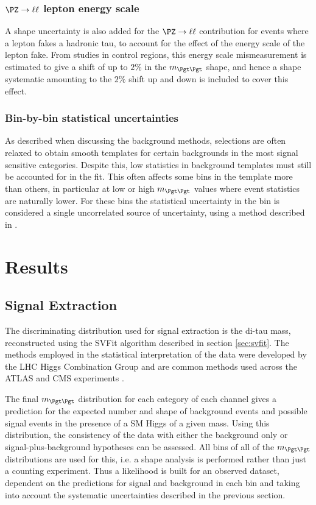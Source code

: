 \subsubsection{\textbf{$\PZ \to \ell\ell$ lepton energy scale}}
A shape uncertainty is also added for the $\PZ \to \ell\ell$ contribution for 
events where a lepton fakes a hadronic tau, to account for the effect of the energy 
scale of the lepton fake. From studies in control regions, this energy scale mismeasurement is 
estimated to give a shift of up to $2\%$ in the $m_{\Pgt\Pgt}$ shape, and hence a shape systematic amounting to the
$2\%$ shift up and down is included to cover this effect. %

\subsubsection{\textbf{Bin-by-bin statistical uncertainties}}
As described when discussing the background methods, selections are often
relaxed to obtain smooth templates for certain backgrounds in the most signal
sensitive categories. Despite this, low statistics in background templates must
still be accounted for in the fit. This often affects some bins in the
template more than others, in particular at low or high $m_{\Pgt\Pgt}$ values
where event statistics are naturally lower. For these bins the statistical
uncertainty in the bin is considered a single uncorrelated source of
uncertainty, using a method described in \cite{Barlow1993219}. 



\section{Results}
\label{sec:results}

\subsection{Signal Extraction}
\label{sec:signalextraction}

The discriminating distribution used for signal extraction is the di-tau mass,
reconstructed using the SVFit algorithm described in section \ref{sec:svfit}. 
The methods employed in the statistical
interpretation of the data were developed by the LHC Higgs Combination Group and
are common methods used across the ATLAS and CMS experiments \cite{LHC-HCG-Report}.

The final $m_{\Pgt\Pgt}$ distribution for each category of each channel gives
a prediction for the expected number and shape of background events and 
possible signal events in the presence of a \ac{SM} Higgs of a given mass. 
Using this distribution, the consistency of the data with either the background only or
signal-plus-background hypotheses can be assessed. All bins of all of the $m_{\Pgt\Pgt}$
distributions are used for this, i.e. a shape analysis is performed rather than just a
counting experiment. Thus a likelihood is built for an observed dataset,
dependent on the predictions for signal and background in each bin and taking into account
the systematic uncertainties described in the previous section.

